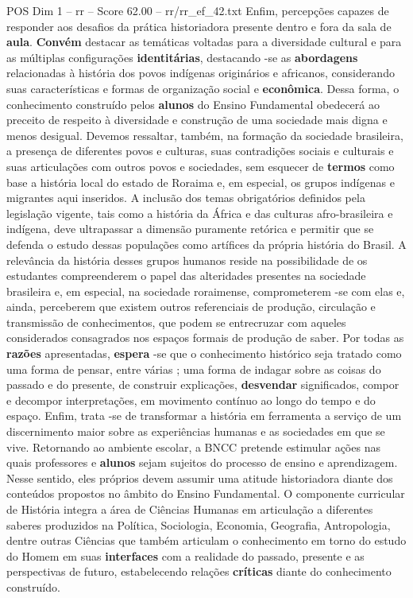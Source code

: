 \begin{textsample}{POS Dim 1 – rr – Score 62.00 – rr/rr\_ef\_42.txt}
Enfim, percepções capazes de responder aos desafios da prática historiadora presente dentro e fora da sala de \textbf{aula}. \textbf{Convém} destacar as temáticas voltadas para a diversidade cultural e para as múltiplas configurações \textbf{identitárias}, destacando -se as \textbf{abordagens} relacionadas à história dos povos indígenas originários e africanos, considerando suas características e formas de organização social e \textbf{econômica}.
Dessa forma, o conhecimento construído pelos \textbf{alunos} do Ensino Fundamental obedecerá ao preceito de respeito à diversidade e construção de uma sociedade mais digna e menos desigual.
Devemos ressaltar, também, na formação da sociedade brasileira, a presença de diferentes povos e culturas, suas contradições sociais e culturais e suas articulações com outros povos e sociedades, sem esquecer de \textbf{termos} como base a história local do estado de Roraima e, em especial, os grupos indígenas e migrantes aqui inseridos.
A inclusão dos temas obrigatórios definidos pela legislação vigente, tais como a história da África e das culturas afro-brasileira e indígena, deve ultrapassar a dimensão puramente retórica e permitir que se defenda o estudo dessas populações como artífices da própria história do Brasil.
A relevância da história desses grupos humanos reside na possibilidade de os estudantes compreenderem o papel das alteridades presentes na sociedade brasileira e, em especial, na sociedade roraimense, comprometerem -se com elas e, ainda, perceberem que existem outros referenciais de produção, circulação e transmissão de conhecimentos, que podem se entrecruzar com aqueles considerados consagrados nos espaços formais de produção de saber.
Por todas as \textbf{razões} apresentadas, \textbf{espera} -se que o conhecimento histórico seja tratado como uma forma de pensar, entre várias ; uma forma de indagar sobre as coisas do passado e do presente, de construir explicações, \textbf{desvendar} significados, compor e decompor interpretações, em movimento contínuo ao longo do tempo e do espaço.
Enfim, trata -se de transformar a história em ferramenta a serviço de um discernimento maior sobre as experiências humanas e as sociedades em que se vive.
Retornando ao ambiente escolar, a BNCC pretende estimular ações nas quais professores e \textbf{alunos} sejam sujeitos do processo de ensino e aprendizagem.
Nesse sentido, eles próprios devem assumir uma atitude historiadora diante dos conteúdos propostos no âmbito do Ensino Fundamental.
O componente curricular de História integra a área de Ciências Humanas em articulação a diferentes saberes produzidos na Política, Sociologia, Economia, Geografia, Antropologia, dentre outras Ciências que também articulam o conhecimento em torno do estudo do Homem em suas \textbf{interfaces} com a realidade do passado, presente e as perspectivas de futuro, estabelecendo relações \textbf{críticas} diante do conhecimento construído.

\end{textsample}
